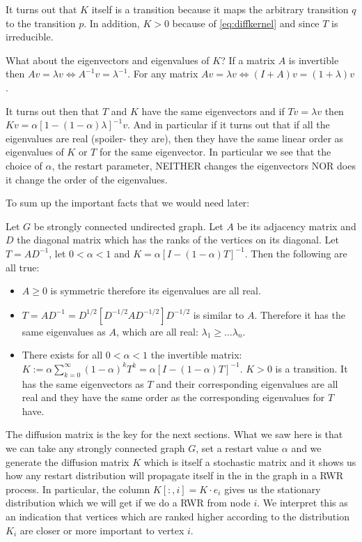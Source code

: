 It turns out that $K$ itself is a transition because it maps the
arbitrary transition $q$ to the transition $p$. In addition, $K \gt 0$ because
of \ref{eq:diffkernel} and since $T$ is irreducible.

What about the eigenvectors and eigenvalues of $K$?
If a matrix $A$ is invertible then $Av = \lambda v \iff A^{-1}v = \lambda^{-1}$.
For any matrix $Av = \lambda v \iff (I + A)v = (1+\lambda)v$.

It turns out then that $T$ and $K$ have the same eigenvectors and if $Tv=\lambda
v$ then $K v = \alpha [1 - (1 - \alpha) \lambda]^{-1} v$. And in particular if it
turns out that if all the eigenvalues are real (spoiler- they are), then they have
the same linear order as eigenvalues of $K$ or $T$ for the same eigenvector.
In particular we see that the choice of $\alpha$, the restart parameter, NEITHER 
changes the eigenvectors NOR does it change the order of the eigenvalues.

To sum up the important facts that we would need later:

\begin{thm}
\label{thm:AKTcharacteristics}
Let $G$ be strongly connected undirected graph. Let $A$ be its adjacency matrix
and $D$ the diagonal matrix which has the ranks of the vertices on its diagonal.
Let $T = A D^{-1}$, let $0 \lt \alpha \lt 1$ and 
$K = \alpha [I - (1 - \alpha)T]^{-1}$. Then the following are all true:

\begin{itemize}

\item{}
$A \geq 0$ is symmetric therefore its eigenvalues are all real.

\item{}
$T = AD^{-1} = D^{1/2}[D^{-1/2}AD^{-1/2}]D^{-1/2}$ is similar to $A$. Therefore
it has the same eigenvalues as $A$, which are all real:
$\lambda_1 \geq \dots \lambda_n$.

\item{}
There exists for all $0 \lt \alpha \lt 1$ the invertible matrix: 
$K := \alpha \sum_{k=0}^{\infty} (1 - \alpha)^k T^k = \alpha [I - (1 -
\alpha)T]^{-1}$.
$K \gt 0$ is a transition. It has the same eigenvectors as $T$ and their
corresponding eigenvalues are all real and they have the same order as the
corresponding eigenvalues for $T$ have.
\end{itemize}
\end{thm}

The diffusion matrix is the key for the next sections. What we saw here is that
we can take any strongly connected graph $G$, set a restart value $\alpha$ and
we generate the diffusion matrix $K$ which is itself a stochastic matrix and it
shows us how any restart distribution will propagate itself in the in the graph
in a RWR process. In particular, the column $K[:,i] = K \cdot e_i$ gives us the
stationary distribution which we will get if we do a RWR from node $i$. We
interpret this as an indication that vertices which are ranked higher according
to the distribution $K_i$ are closer or more important to vertex $i$.

